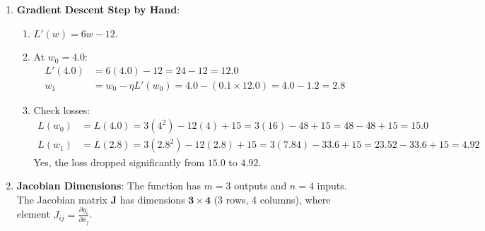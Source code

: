 \begin{enumerate}
    \item \textbf{Gradient Descent Step by Hand}:
    \begin{enumerate}[label=(\alph*)]
        \item $L'(w) = 6w - 12$.
        \item At $w_0 = 4.0$:
        \begin{align*}
        L'(4.0) &= 6(4.0) - 12 = 24 - 12 = 12.0 \\
        w_1 &= w_0 - \eta L'(w_0) = 4.0 - (0.1 \times 12.0) = 4.0 - 1.2 = \mathbf{2.8}
        \end{align*}
        \item Check losses:
        \begin{align*}
        L(w_0) &= L(4.0) = 3(4^2) - 12(4) + 15 = 3(16) - 48 + 15 = 48 - 48 + 15 = \mathbf{15.0} \\
        L(w_1) &= L(2.8) = 3(2.8^2) - 12(2.8) + 15 = 3(7.84) - 33.6 + 15 = 23.52 - 33.6 + 15 = \mathbf{4.92}
        \end{align*}
        Yes, the loss dropped significantly from $15.0$ to $4.92$.
    \end{enumerate}

    \item \textbf{Jacobian Dimensions}:
    The function has $m = 3$ outputs and $n = 4$ inputs. 
    The Jacobian matrix $\mathbf{J}$ has dimensions $\mathbf{3 \times 4}$ (3 rows, 4 columns), where element $J_{ij} = \frac{\partial y_i}{\partial x_j}$.
\end{enumerate}
